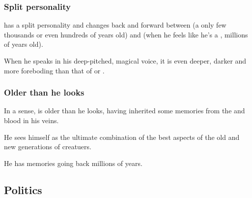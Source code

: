 \subsubsection{Split personality}
\Vizsherioch{} has a split personality and changes back and forward between  (a \dragon{} only few thousands or even hundreds of years old) and  (when he feels like he's a \xs, millions of years old). 

When he speaks in his deep-pitched, magical voice, it is even deeper, darker and more foreboding than that of \Ishnaruchaefir{} or \Secherdamon. 





\subsubsection{Older than he looks}
In a sense, \Vizsherioch{} is older than he looks, having inherited some memories from the \resphan{} and \xzaishann{} blood in his veins.

He sees himself as the ultimate combination of the best aspects of the old and new generations of creatuers. 



He has memories going back millions of years. 








\subsection{Politics}

